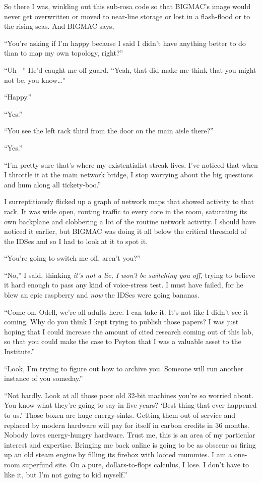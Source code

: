 So there I was, winkling out this sub-rosa code so that BIGMAC's image 
would never get overwritten or moved to near-line storage or lost in a 
flash-flood or to the rising seas. And BIGMAC says,

“You're asking if I'm happy because I said I didn't have anything 
better to do than to map my own topology, right?”

“Uh --” He'd caught me off-guard. “Yeah, that did make me think 
that you might not be, you know\ldots{}”

“Happy.”

“Yes.”

“You see the left rack third from the door on the main aisle there?”

“Yes.”

“I'm pretty sure that's where my existentialist streak lives. I've 
noticed that when I throttle it at the main network bridge, I stop 
worrying about the big questions and hum along all tickety-boo.”

I surreptitiously flicked up a graph of network maps that showed 
activity to that rack. It was wide open, routing traffic to every core 
in the room, saturating its own backplane and clobbering a lot of the 
routine network activity. I should have noticed it earlier, but BIGMAC 
was doing it all below the critical threshold of the IDSes and so I had 
to look at it to spot it.

“You're going to switch me off, aren't you?”

“No,” I said, thinking \emph{it's not a lie, I won't be switching 
you off}, trying to believe it hard enough to pass any kind of 
voice-stress test. I must have failed, for he blew an epic raspberry 
and \emph{now} the IDSes were going bananas.

“Come on, Odell, we're all adults here. I can take it. It's not like 
I didn't see it coming. Why do you think I kept trying to publish those 
papers? I was just hoping that I could increase the amount of cited 
research coming out of this lab, so that you could make the case to 
Peyton that I was a valuable asset to the Institute.”

“Look, I'm trying to figure out how to archive you. Someone will run 
another instance of you someday.”

“Not hardly. Look at all those poor old 32-bit machines you're so 
worried about. You know what they're going to say in five years? `Best 
thing that ever happened to us.' Those boxen are huge energy-sinks. 
Getting them out of service and replaced by modern hardware will pay 
for itself in carbon credits in 36 months. Nobody loves energy-hungry 
hardware. Trust me, this is an area of my particular interest and 
expertise. Bringing me back online is going to be as obscene as firing 
up an old steam engine by filling its firebox with looted mummies. I am 
a one-room superfund site. On a pure, dollars-to-flops calculus, I 
lose. I don't have to like it, but I'm not going to kid myself.”

